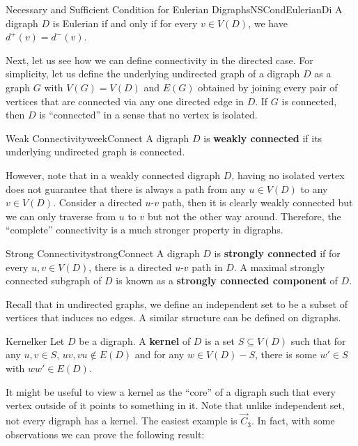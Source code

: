 \documentclass[math]{amznotes}
\theoremstyle{remark}
\newcommand{\0}{\mathbf{0}}
\newcommand{\1}{\mathbf{1}}
\begin{document}
\begin{probox}{Necessary and Sufficient Condition for Eulerian Digraphs}{NSCondEulerianDi}
    A digraph $D$ is Eulerian if and only if for every $v \in V(D)$, we have $d^+(v) = d^-(v)$.
\end{probox}
Next, let us see how we can define connectivity in the directed case. For simplicity, let us define the underlying undirected graph of a digraph $D$ as a graph $G$ with $V(G) = V(D)$ and $E(G)$ obtained by joining every pair of vertices that are connected via any one directed edge in $D$. If $G$ is connected, then $D$ is ``connected'' in a sense that no vertex is isolated.
\begin{dfnbox}{Weak Connectivity}{weekConnect}
    A digraph $D$ is {\color{red} \textbf{weakly connected}} if its underlying undirected graph is connected.
\end{dfnbox}
However, note that in a weakly connected digraph $D$, having no isolated vertex does not guarantee that there is always a path from any $u \in V(D)$ to any $v \in V(D)$. Consider a directed $u$-$v$ path, then it is clearly weakly connected but we can only traverse from $u$ to $v$ but not the other way around. Therefore, the ``complete'' connectivity is a much stronger property in digraphs.
\begin{dfnbox}{Strong Connectivity}{strongConnect}
    A digraph $D$ is {\color{red} \textbf{strongly connected}} if for every $u, v \in V(D)$, there is a directed $u$-$v$ path in $D$. A maximal strongly connected subgraph of $D$ is known as a {\color{red} \textbf{strongly connected component}} of $D$.
\end{dfnbox}
Recall that in undirected graphs, we define an independent set to be a subset of vertices that induces no edges. A similar structure can be defined on digraphs.
\begin{dfnbox}{Kernel}{ker}
    Let $D$ be a digraph. A {\color{red} \textbf{kernel}} of $D$ is a set $S \subseteq V(D)$ such that for any $u, v \in S$, $uv, vu \notin E(D)$ and for any $w \in V(D) - S$, there is some $w' \in S$ with $ww' \in E(D)$.
\end{dfnbox}
It might be useful to view a kernel as the ``core'' of a digraph such that every vertex outside of it points to something in it. Note that unlike independent set, not every digraph has a kernel. The easiest example is $\overrightarrow{C}_3$. In fact, with some observations we can prove the following result:
\end{document}
